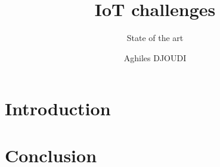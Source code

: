 \documentclass[8pt]{beamer}
\title{IoT challenges}
\subtitle{State of the art}
\author{Aghiles DJOUDI}
\institute{LIGM/ESIEE Paris \& SIC/ECE Paris}
\begin{document}
\firstpage

\section{Introduction}
		

\tableofcontent

%	
%	
%	
%	
%	

%		
%		
%		
%		
%		

%		
%		
%		
%		
%		

\section{Conclusion}
		


\frameBibliography
\end{document}
